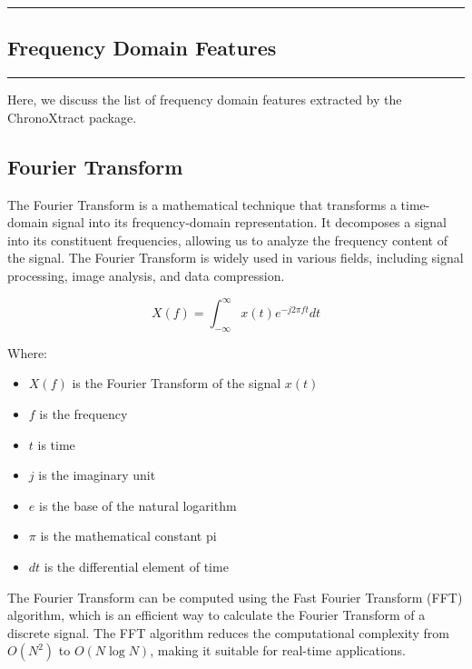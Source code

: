 {\color{gray}\hrule}
\begin{center}
\section{Frequency Domain Features}
\bigskip
\end{center}
{\color{gray}\hrule}
Here, we discuss the list of frequency domain features extracted by the ChronoXtract package. 

\subsection{Fourier Transform}
The Fourier Transform is a mathematical technique that transforms a time-domain signal into its frequency-domain representation. It decomposes a signal into its constituent frequencies, allowing us to analyze the frequency content of the signal. 
The Fourier Transform is widely used in various fields, including signal processing, image analysis, and data compression.

\begin{equation}
X(f) = \int_{-\infty}^{\infty} x(t) e^{-j2\pi ft} dt
\end{equation}

Where:
\begin{itemize}
    \item \(X(f)\) is the Fourier Transform of the signal \(x(t)\)
    \item \(f\) is the frequency
    \item \(t\) is time
    \item \(j\) is the imaginary unit
    \item \(e\) is the base of the natural logarithm
    \item \(\pi\) is the mathematical constant pi
    \item \(dt\) is the differential element of time
\end{itemize}
The Fourier Transform can be computed using the Fast Fourier Transform (FFT) algorithm, which is an efficient way to calculate the Fourier Transform of a discrete signal. The FFT algorithm reduces the computational complexity from \(O(N^2)\) to \(O(N \log N)\), making it suitable for real-time applications.

